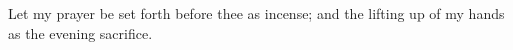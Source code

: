 \documentclass[MAIN]{subfiles}
\begin{document}
Let my prayer be set forth before thee as incense; and the lifting up of my hands as the evening sacrifice.
\end{document}
